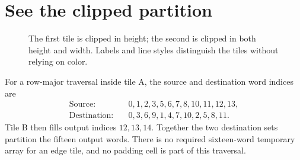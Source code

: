 \section{See the clipped partition}\label{transpose-x-tile-map}
\begin{figure}[htbp]
  \centering
  \caption{The first tile is clipped in height; the second is clipped in both height and width. Labels and line styles distinguish the tiles without relying on color.}
\end{figure}
For a row-major traversal inside tile A, the source and destination word indices are
\[
  \begin{aligned}
    \text{Source:}\quad      & 0,1,2,3,5,6,7,8,10,11,12,13, \\
    \text{Destination:}\quad & 0,3,6,9,1,4,7,10,2,5,8,11.
  \end{aligned}
\]
Tile B then fills output indices \(12,13,14\).
Together the two destination sets partition the fifteen output words. There is no
required sixteen-word temporary array for an edge tile, and no padding cell is
part of this traversal.
